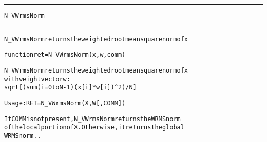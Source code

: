 \begin{samepage}
\hrule
\begin{center}
{\large \verb!N_VWrmsNorm!}
\label{p:N_VWrmsNorm}
\end{center}
\hrule\vspace{0.1in}



\begin{alltt}
N_VWrmsNorm returns the weighted root mean square norm of x
\end{alltt}

\end{samepage}



\begin{samepage}


\begin{alltt}
function ret = N_VWrmsNorm(x,w,comm) 
\end{alltt}

\end{samepage}



\begin{alltt}
N_VWrmsNorm returns the weighted root mean square norm of x 
with weight vector w: 
   sqrt [(sum (i = 0 to N-1) {(x[i]*w[i])^2})/N]

   Usage:  RET = N_VWrmsNorm ( X, W [, COMM] )   

If COMM is not present, N_VWrmsNorm returns the WRMS norm
of the local portion of X. Otherwise, it returns the global
WRMS norm..
\end{alltt}





 



\vspace{0.1in}